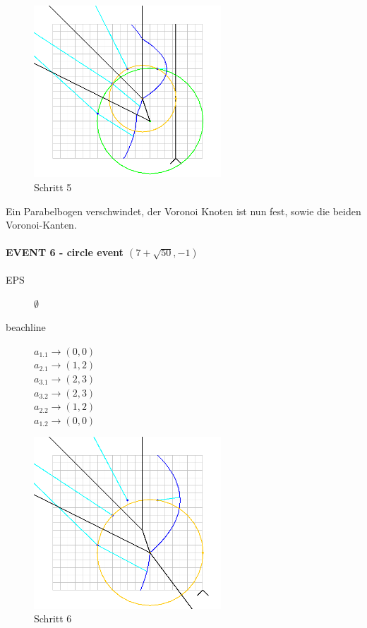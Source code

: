 \begin{figure}[h]
\begin{center}
\includegraphics[width=7cm]{capture5}
\end{center}
\caption{Schritt 5}
\label{fig:c5}
\end{figure}

Ein Parabelbogen verschwindet, der Voronoi Knoten ist nun fest, sowie die beiden Voronoi-Kanten.

\newpage

\paragraph*{EVENT 6 - circle event $(7 + \sqrt{50}, -1)$}
\begin{description}
\item[EPS] $\emptyset$
\item[beachline]
$a_{1.1} \rightarrow (0,0)$\\
$a_{2.1} \rightarrow (1,2)$\\
$a_{3.1} \rightarrow (2,3)$\\
$a_{3.2} \rightarrow (2,3)$\\
$a_{2.2} \rightarrow (1,2)$\\
$a_{1.2} \rightarrow (0,0)$
\end{description}

\begin{figure}[h]
\begin{center}
\includegraphics[width=7cm]{capture6}
\end{center}
\caption{Schritt 6}
\label{fig:c6}
\end{figure}

